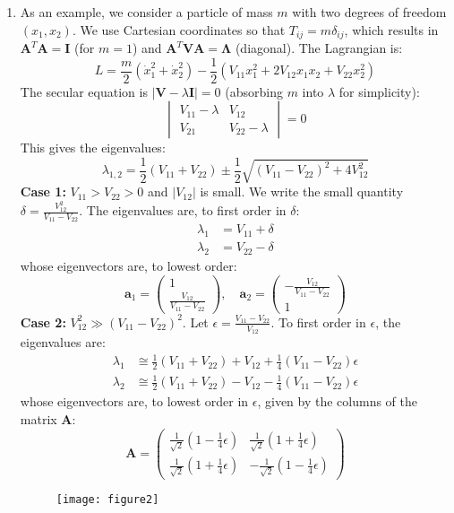 \documentclass[12pt]{article}
\begin{document}
\begin{enumerate}
		\item As an example, we consider a particle of mass $m$ with two degrees of freedom $(x_1, x_2)$. We use Cartesian coordinates so that $T_{ij} = m\delta_{ij}$, which results in $\mathbf{A}^T\mathbf{A}=\mathbf{I}$ (for $m=1$) and $\mathbf{A}^T\mathbf{V}\mathbf{A} = \mathbf{\Lambda}$ (diagonal). The Lagrangian is:
		\[
		L = \frac{m}{2}(\dot{x}_1^2 + \dot{x}_2^2) - \frac{1}{2}(V_{11}x_1^2 + 2V_{12}x_1x_2 + V_{22}x_2^2)
		\]
		The secular equation is $|\mathbf{V} - \lambda\mathbf{I}| = 0$ (absorbing $m$ into $\lambda$ for simplicity):
		\[
		\begin{vmatrix}
			V_{11} - \lambda & V_{12} \\
			V_{21} & V_{22} - \lambda
		\end{vmatrix} = 0
		\]
		This gives the eigenvalues:
		\[
		\lambda_{1,2} = \frac{1}{2}(V_{11} + V_{22}) \pm \frac{1}{2}\sqrt{(V_{11} - V_{22})^2 + 4V_{12}^2}
		\]
		\textbf{Case 1:} $V_{11} > V_{22} > 0$ and $|V_{12}|$ is small. We write the small quantity $\delta = \frac{V_{12}^2}{V_{11} - V_{22}}$. The eigenvalues are, to first order in $\delta$:
		\begin{align*}
			\lambda_1 &= V_{11} + \delta \\
			\lambda_2 &= V_{22} - \delta
		\end{align*}
		whose eigenvectors are, to lowest order:
		\[
		\mathbf{a}_1 = \begin{pmatrix} 1 \\ \frac{V_{12}}{V_{11}-V_{22}} \end{pmatrix}, \quad \mathbf{a}_2 = \begin{pmatrix} -\frac{V_{12}}{V_{11}-V_{22}} \\ 1 \end{pmatrix}
		\]
		\textbf{Case 2:} $V_{12}^2 \gg (V_{11}-V_{22})^2$. Let $\epsilon = \frac{V_{11}-V_{22}}{V_{12}}$. To first order in $\epsilon$, the eigenvalues are:
		\begin{align*}
			\lambda_1 &\cong \frac{1}{2}(V_{11}+V_{22}) + V_{12} + \frac{1}{4}(V_{11}-V_{22})\epsilon \\
			\lambda_2 &\cong \frac{1}{2}(V_{11}+V_{22}) - V_{12} - \frac{1}{4}(V_{11}-V_{22})\epsilon
		\end{align*}
		whose eigenvectors are, to lowest order in $\epsilon$, given by the columns of the matrix $\mathbf{A}$:
		\[
		\mathbf{A} = \begin{pmatrix}
			\frac{1}{\sqrt{2}}(1 - \frac{1}{4}\epsilon) & \frac{1}{\sqrt{2}}(1 + \frac{1}{4}\epsilon) \\[1em]
			\frac{1}{\sqrt{2}}(1 + \frac{1}{4}\epsilon) & -\frac{1}{\sqrt{2}}(1 - \frac{1}{4}\epsilon)
		\end{pmatrix}
		\]
		\begin{figure}[h]
			\centering
			\texttt{[image: figure2]}
			\caption{}
			\label{fig:figure2}
		\end{figure}
	\end{enumerate}
\end{document}
